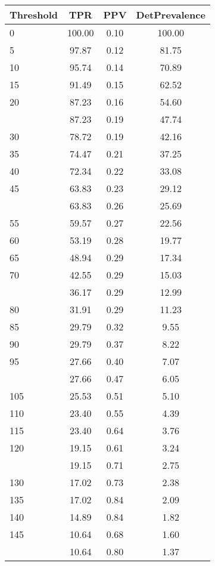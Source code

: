 \begin{table}[ht]
\centering
\begin{tabular}{lccc}
  \toprule
Threshold & TPR & PPV & DetPrevalence \\ 
  \midrule
0 & 100.00 & 0.10 & 100.00 \\ 
  5 & 97.87 & 0.12 & 81.75 \\ 
  10 & 95.74 & 0.14 & 70.89 \\ 
  15 & 91.49 & 0.15 & 62.52 \\ 
  20 & 87.23 & 0.16 & 54.60 \\ 
   \addlinespace
25 & 87.23 & 0.19 & 47.74 \\ 
  30 & 78.72 & 0.19 & 42.16 \\ 
  35 & 74.47 & 0.21 & 37.25 \\ 
  40 & 72.34 & 0.22 & 33.08 \\ 
  45 & 63.83 & 0.23 & 29.12 \\ 
   \addlinespace
50 & 63.83 & 0.26 & 25.69 \\ 
  55 & 59.57 & 0.27 & 22.56 \\ 
  60 & 53.19 & 0.28 & 19.77 \\ 
  65 & 48.94 & 0.29 & 17.34 \\ 
  70 & 42.55 & 0.29 & 15.03 \\ 
   \addlinespace
75 & 36.17 & 0.29 & 12.99 \\ 
  80 & 31.91 & 0.29 & 11.23 \\ 
  85 & 29.79 & 0.32 & 9.55 \\ 
  90 & 29.79 & 0.37 & 8.22 \\ 
  95 & 27.66 & 0.40 & 7.07 \\ 
   \addlinespace
100 & 27.66 & 0.47 & 6.05 \\ 
  105 & 25.53 & 0.51 & 5.10 \\ 
  110 & 23.40 & 0.55 & 4.39 \\ 
  115 & 23.40 & 0.64 & 3.76 \\ 
  120 & 19.15 & 0.61 & 3.24 \\ 
   \addlinespace
125 & 19.15 & 0.71 & 2.75 \\ 
  130 & 17.02 & 0.73 & 2.38 \\ 
  135 & 17.02 & 0.84 & 2.09 \\ 
  140 & 14.89 & 0.84 & 1.82 \\ 
  145 & 10.64 & 0.68 & 1.60 \\ 
   \addlinespace
150 & 10.64 & 0.80 & 1.37 \\ 

\end{tabular}
\end{table}
